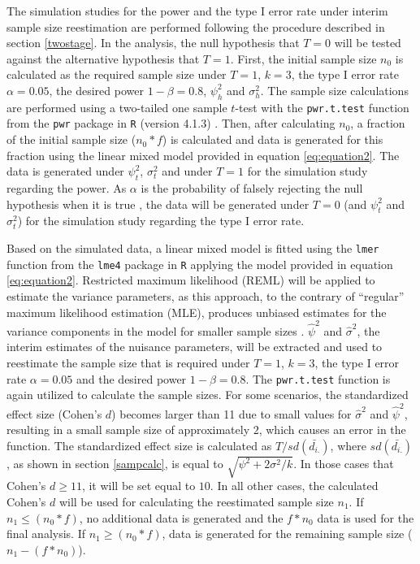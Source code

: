 \documentclass[AMA,STIX1COL,]{WileyNJD-v2}
\begin{document}
The simulation studies for the power and the type I error rate under interim sample size reestimation are performed following the procedure described in section \ref{twostage}. In the analysis, the null hypothesis that \(T=0\) will be tested against the alternative hypothesis that \(T=1\). First, the initial sample size \(n_0\) is calculated as the required sample size under \(T = 1\), \(k=3\), the type I error rate \(\alpha = 0.05\), the desired power \(1-\beta = 0.8\), \(\psi_h^2\) and \(\sigma_h^2\). The sample size calculations are performed using a two-tailed one sample \(t\)-test with the \texttt{pwr.t.test} function from the \texttt{pwr} package \citep{champely2018} in \texttt{R} (version 4.1.3) \citep{Rmanual}. Then, after calculating \(n_0\), a fraction of the initial sample size (\(n_0 * f\)) is calculated and data is generated for this fraction using the linear mixed model provided in equation \eqref{eq:equation2}. The data is generated under \(\psi_t^2\), \(\sigma_t^2\) and under \(T=1\) for the simulation study regarding the power. As \(\alpha\) is the probability of falsely rejecting the null hypothesis when it is true \citep{neyman1933}, the data will be generated under \(T = 0\) (and \(\psi_t^2\) and \(\sigma_t^2\)) for the simulation study regarding the type I error rate.

Based on the simulated data, a linear mixed model is fitted using the \texttt{lmer} function from the \texttt{lme4} package \citep{lme4} in \texttt{R} applying the model provided in equation \eqref{eq:equation2}. Restricted maximum likelihood (REML) will be applied to estimate the variance parameters, as this approach, to the contrary of ``regular'' maximum likelihood estimation (MLE), produces unbiased estimates for the variance components in the model for smaller sample sizes \citep{corbeil1976}. \(\hat{\psi}^2\) and \(\hat{\sigma}^2\), the interim estimates of the nuisance parameters, will be extracted and used to reestimate the sample size that is required under \(T = 1\), \(k = 3\), the type I error rate \(\alpha = 0.05\) and the desired power \(1-\beta = 0.8\). The \texttt{pwr.t.test} function is again utilized to calculate the sample sizes. For some scenarios, the standardized effect size (Cohen's \(d\)) becomes larger than 11 due to small values for \(\hat{\sigma}^2\) and \(\hat{\psi}^2\), resulting in a small sample size of approximately \(2\), which causes an error in the function. The standardized effect size is calculated as \(T/sd(\bar{d_{i.}})\), where \(sd(\bar{d_{i.}})\), as shown in section \ref{sampcalc}, is equal to \(\sqrt{\psi^2 + 2\sigma^2 /k}\). In those cases that Cohen's \(d \geq 11\), it will be set equal to \(10\). In all other cases, the calculated Cohen's \(d\) will be used for calculating the reestimated sample size \(n_1\). If \(n_1 \leq (n_0*f)\), no additional data is generated and the \(f*n_0\) data is used for the final analysis. If \(n_1 \geq (n_0*f)\), data is generated for the remaining sample size (\(n_1 - (f*n_0)\)).
\end{document}
